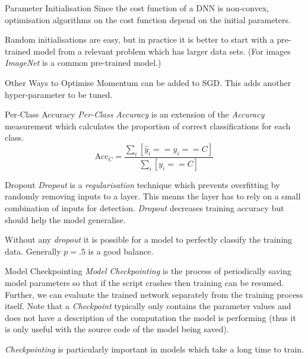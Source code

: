 \documentclass[11pt,a4paper]{article}
\begin{document}
  \begin{remark}{Parameter Initialisation}
    Since the cost function of a DNN is non-convex, optimisation algorithms on the cost function depend on the initial parameters.
    \par Random initialisations are easy, but in practice it is better to start with a pre-trained model from a relevant problem which has larger data sets. (For images \textit{ImageNet} is a common pre-trained model.)
  \end{remark}

  \begin{remark}{Other Ways to Optimise}
    Momentum can be added to SGD. This adds another hyper-parameter to be tuned.
  \end{remark}

  \begin{proposition}{Per-Class Accuracy}
    \textit{Per-Class Accuracy} is an extension of the \textit{Accuracy} measurement which calculates the proportion of correct classifications for each class.
    \[ \text{Acc}_C=\frac{\sum_i[\hat{y}_i==y_i==C]}{\sum_i[y_i==C]} \]
  \end{proposition}

  \begin{remark}{Dropout}
    \textit{Dropout} is a \textit{regularisation} technique which prevents overfitting by randomly removing inputs to a layer. This means the layer has to rely on a small combination of inputs for detection. \textit{Dropout} decreases training accuracy but should help the model generalise.
    \par Without any \textit{dropout} it is possible for a model to perfectly classify the training data. Generally $p=.5$ is a good balance.
  \end{remark}

  \begin{proposition}{Model Checkpointing}
    \textit{Model Checkpointing} is the process of periodically saving model parameters so that if the script crashes then training can be resumed. Further, we can evaluate the trained network separately from the training process itself. Note that a \textit{Checkpoint} typically only contains the parameter values and does not have a description of the computation the model is performing (thus it is only useful with the source code of the model being saved).
    \par \textit{Checkpointing} is particularly important in models which take a long time to train.
  \end{proposition}
\end{document}
